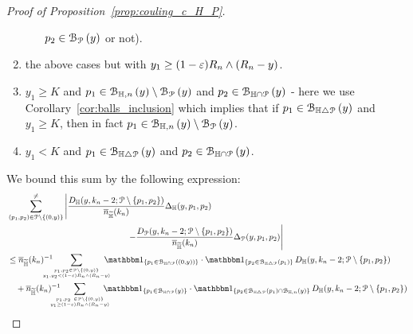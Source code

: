 \begin{proof}[Proof of Proposition~\ref{prop:couling_c_H_P}]
\begin{enumerate}
\begin{enumerate}
$p_2 \in {\mathcal B}_{{\mathcal P}}\left(y\right)$ or not).
\end{enumerate}
\item the above cases but with $y_1 \geq (1-\varepsilon) R_n \wedge (R_n -y)$. 
\item $y_1 \geq K$ and $p_1 \in {\mathcal B}_{\mathbb{H},n}\left(y\right) \setminus 
{\mathcal B}_{{\mathcal P}}\left(y\right)$ and $p_2 \in {\mathcal B}_{\mathbb{H} \cap {\mathcal P}}\left(y\right)$ - here we use 
Corollary~\ref{cor:balls_inclusion} which implies that if $p_1 \in {\mathcal B}_{\mathbb{H} \bigtriangleup {\mathcal P}}\left(y\right)$ and $y_1 \geq K$, then in fact $p_1 \in {\mathcal B}_{\mathbb{H},n}\left(y\right) \setminus {\mathcal B}_{{\mathcal P}}\left(y\right)$. 
\item $y_1 < K$ and $p_1 \in {\mathcal B}_{\mathbb{H} \bigtriangleup {\mathcal P}}\left(y\right)$ and $p_2 \in {\mathcal B}_{\mathbb{H} \cap {\mathcal P}}\left(y\right)$. 
\end{enumerate}
We bound this sum by the following expression:
\begin{align} 
&\sum_{(p_1,p_2) \in \Pcal \setminus \{(0,y)\}}^{\not =} 
  \left| \frac{D_{\H}(y,k_n-2; \Pcal \setminus \{p_1,p_2 \})}{\expH} \Delta_\H (y,p_1,p_2) \right. \notag \\
  & \hspace{5cm} \left. - \frac{D_{\Pcal} (y,k_n-2;\Pcal \setminus \{p_1,p_2\})}{\expH} \Delta_{\Pcal} (y,p_1,p_2)
   \right|  \notag \\
&\le \expH^{-1} \hspace{-15pt} \sum_{p_1,p_2\in \Pcal \setminus \{(0,y)\} \atop  y_1, y_2 < (1-\eps)R_n \wedge (R_n-y)} 
	\hspace{-10pt} \ind{p_1 \in \BallInter{(0,y)}} \cdot \ind{p_2 \in \BallSym{p_1}} 
	\, D_\H (y,k_n-2;\Pcal \setminus \{ p_1,p_2\}) \label{eq:sum_1}\\
&\hspace{10pt}+ \expH^{-1} \hspace{-15pt} \sum_{p_1,p_2 \ \in \Pcal \setminus \{(0,y) \} 
	\atop y_1 \geq (1-\eps) R_n \wedge (R_n-y)} \hspace{-10pt}
	\ind{p_1 \in \BallInter{y}} \cdot \ind{p_2 \in \BallSym{p_1}\cap \BallHyp{y}} 
	\, D_\H (y,k_n-2;\Pcal \setminus \{ p_1,p_2\}) \label{eq:sum_3} \\

\end{align}
\end{proof}
